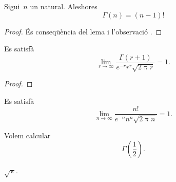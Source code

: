 \documentclass[../analisi-matematica.tex]{subfiles}
\begin{document}
    \begin{lemma} %
        \label{lema:la-Gamma-dEuler-es-comporta-com-un-factorial}
        Sigui~\(n\) un natural.
        Aleshores
        \[
            \Gamma(n)=(n-1)!
        \]
    \end{lemma}
    \begin{proof}
        És conseqüència del lema  i l'observació .
    \end{proof}
    \begin{theorem}
        \label{thm:formula-dStirling}
        Es satisfà
        \[
            \lim_{r\to\infty}\frac{\Gamma(r+1)}{e^{-r}r^{r}\sqrt{2\uppi r}}=1.
        \]
    \end{theorem}
    \begin{proof}
    \end{proof}
    \begin{corollary}
        \label{cor:formula-dStirling}
        Es satisfà
        \[
            \lim_{n\to\infty}\frac{n!}{e^{-n}n^{n}\sqrt{2\uppi n}}=1.
        \]
    \end{corollary}
    \begin{example}
        Volem calcular
        \[
            \Gamma\left(\frac{1}{2}\right).
        \]
    \end{example}
    \begin{solution}
        \(\sqrt{\uppi}\).
    \end{solution}
\end{document}
